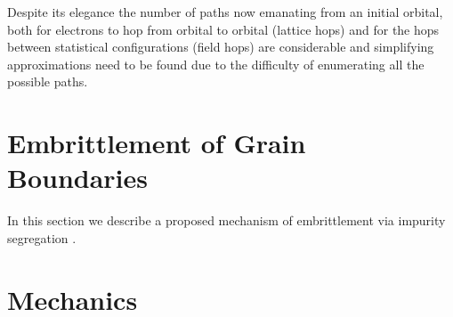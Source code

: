 Despite its elegance the number of paths now emanating from an initial orbital, both
for electrons to hop from orbital to orbital (lattice hops) and for the hops between 
statistical configurations (field hops) are considerable and simplifying approximations 
need to be found due to the difficulty of enumerating all the possible paths.

\section{Embrittlement of Grain Boundaries}
In this section we describe a proposed mechanism of embrittlement via impurity
segregation \cite{haydock82}.

\section{Mechanics}
